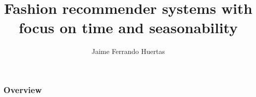 \documentclass{beamer}
\title[Fashion recommender systems]{Fashion recommender systems with focus on time and 
        seasonability} %
\author{Jaime Ferrando Huertas} %
{

\medskip
}
\date{\mydate} %
\begin{document}
\begin{frame}
\titlepage %
\end{frame}

\begin{frame}
\frametitle{Overview} %
\tableofcontents %
\end{frame}


\end{document}
